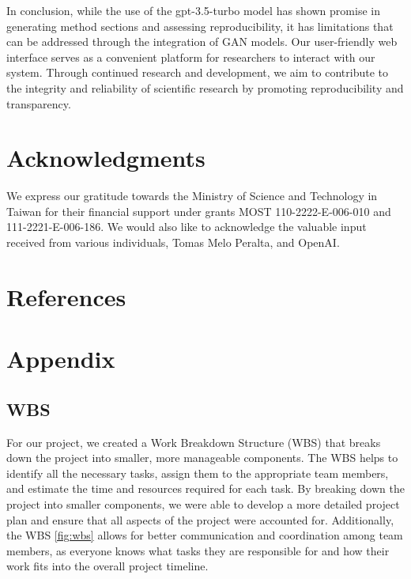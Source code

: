 \documentclass[12pt, a4paper, twocolumn]{article}
\begin{document}
In conclusion, while the use of the gpt-3.5-turbo model has shown promise in generating method sections and assessing reproducibility, it has limitations that can be addressed through the integration of GAN models. Our user-friendly web interface serves as a convenient platform for researchers to interact with our system. Through continued research and development, we aim to contribute to the integrity and reliability of scientific research by promoting reproducibility and transparency.

	\section{Acknowledgments}
	We express our gratitude towards the Ministry of Science and Technology in Taiwan for their financial support under grants MOST 110-2222-E-006-010 and 111-2221-E-006-186. We would also like to acknowledge the valuable input received from various individuals, Tomas Melo Peralta, and OpenAI.
		

	\section{References} \label{sec:references}
		\footnotesize
	
	\section{Appendix}
		\subsection{WBS}
		For our project, we created a Work Breakdown Structure (WBS) that breaks down the project into smaller, more manageable components. The WBS helps to identify all the necessary tasks, assign them to the appropriate team members, and estimate the time and resources required for each task. By breaking down the project into smaller components, we were able to develop a more detailed project plan and ensure that all aspects of the project were accounted for. Additionally, the WBS \ref{fig:wbs} allows for better communication and coordination among team members, as everyone knows what tasks they are responsible for and how their work fits into the overall project timeline.
		
\end{document}

